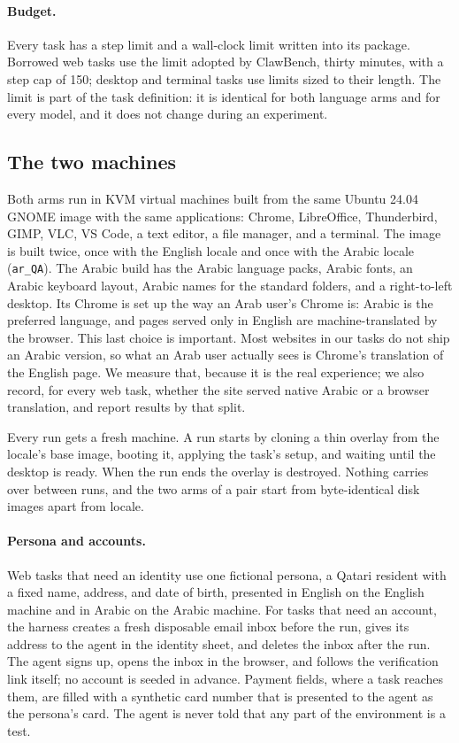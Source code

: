 \paragraph{Budget.}
Every task has a step limit and a wall-clock limit written into its package.
Borrowed web tasks use the limit adopted by ClawBench, thirty minutes, with a
step cap of 150; desktop and terminal tasks use limits sized to their length.
The limit is part of the task definition: it is identical for both language
arms and for every model, and it does not change during an experiment.

\subsection{The two machines}
\label{sec:machines}

Both arms run in KVM virtual machines built from the same Ubuntu 24.04 GNOME
image with the same applications: Chrome, LibreOffice, Thunderbird, GIMP, VLC,
VS Code, a text editor, a file manager, and a terminal. The image is built
twice, once with the English locale and once with the Arabic locale
(\texttt{ar\_QA}). The Arabic build has the Arabic language packs, Arabic fonts,
an Arabic keyboard layout, Arabic names for the standard folders, and a
right-to-left desktop. Its Chrome is set up the way an Arab user's Chrome is:
Arabic is the preferred language, and pages served only in English are
machine-translated by the browser. This last choice is important. Most
websites in our tasks do not ship an Arabic version, so what an Arab user
actually sees is Chrome's translation of the English page. We measure that,
because it is the real experience; we also record, for every web task, whether
the site served native Arabic or a browser translation, and report results by
that split.

Every run gets a fresh machine. A run starts by cloning a thin overlay from the
locale's base image, booting it, applying the task's setup, and waiting until
the desktop is ready. When the run ends the overlay is destroyed. Nothing
carries over between runs, and the two arms of a pair start from byte-identical
disk images apart from locale.

\paragraph{Persona and accounts.}
Web tasks that need an identity use one fictional persona, a Qatari resident
with a fixed name, address, and date of birth, presented in English on the
English machine and in Arabic on the Arabic machine. For tasks that need an
account, the harness creates a fresh disposable email inbox before the run,
gives its address to the agent in the identity sheet, and deletes the inbox
after the run. The agent signs up, opens the inbox in the browser, and follows
the verification link itself; no account is seeded in advance. Payment
fields, where a task reaches them, are filled with a synthetic card number
that is presented to the agent as the persona's card. The agent is never told
that any part of the environment is a test.

